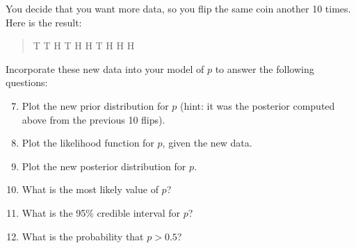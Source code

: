 \documentclass[10pt]{article}
\begin{document}
You decide that you want more data, so you flip the same coin another
10 times. Here is the result:

\begin{quote}
T T H T H H T H H H
\end{quote}

Incorporate these new data into your model of $p$ to answer the
following questions:

\begin{enumerate}
\setcounter{enumi}{6}

\item Plot the new prior distribution for $p$ (hint: it was the
  posterior computed above from the previous 10 flips).

\item Plot the likelihood function for $p$, given the new data.

\item Plot the new posterior distribution for $p$.

\item What is the most likely value of $p$?

\item What is the 95\% credible interval for $p$?

\item What is the probability that $p > 0.5$?

\end{enumerate}
\end{document}
